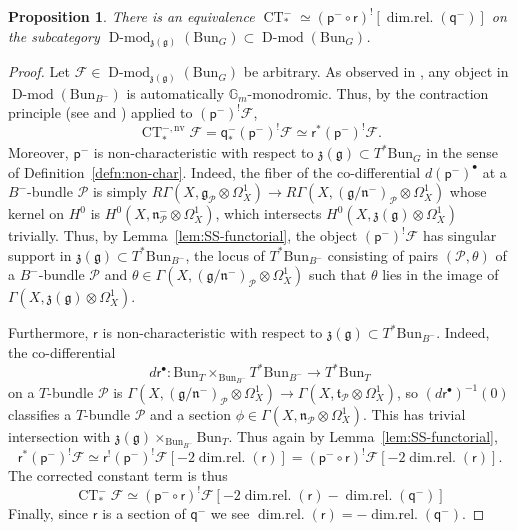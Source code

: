 \documentclass[11pt]{amsart}
\newcommand{\fg}{\mathfrak{g}}
\newcommand{\fn}{\mathfrak{n}}
\newcommand{\fz}{\mathfrak{z}}
\newcommand{\bG}{\mathbb{G}}
\newcommand{\cF}{\mathcal{F}}
\newcommand{\ft}{{\mathfrak{t}}}
\newcommand{\cP}{{\mathcal{P}}}
\newcommand{\Bun}{{\mathrm{Bun}}}
\newcommand{\CT}{\operatorname{CT}}
\newcommand{\pp}{{\mathsf{p}}}
\newcommand{\qq}{{\mathsf{q}}}
\newcommand{\rr}{{\mathsf{r}}}
\DeclareMathOperator{\Dmod}{D-mod}
\newtheorem{prop}[thm]{Proposition}
\theoremstyle{remark}
\theoremstyle{definition}
\begin{document}
\begin{prop}\label{prop:eisenstein-and-delta}
    There is an equivalence $\CT^-_*\simeq(\pp^-\circ\rr)^![\operatorname{dim.rel.}(\qq^-)]$ on the subcategory $\Dmod_{\fz(\fg)}(\Bun_G)\subset\Dmod(\Bun_G)$. 
\end{prop}
\begin{proof}
Let $\cF\in\Dmod_{\fz(\fg)}(\Bun_G)$ be arbitrary. As observed in \cite[\S4.1.6]{constant-term}, any object in $\Dmod(\Bun_{B^-})$ is automatically $\bG_m$-monodromic. Thus, by the contraction principle (see \cite[\S4.1]{constant-term} and \cite[Theorem~C.5.3]{compact-generation}) applied to $(\pp^-)^!\cF$,
\[
\CT^{-,\mathrm{nv}}_*\cF=\qq^-_*(\pp^-)^!\cF\simeq\rr^*(\pp^-)^!\cF.
\]
Moreover, $\pp^-$ is non-characteristic with respect to $\fz(\fg)\subset T^*\Bun_G$ in the sense of Definition~\ref{defn:non-char}. Indeed, the fiber of the co-differential $d(\pp^-)^\bullet$ at a $B^-$-bundle $\cP$ is simply $R\Gamma(X,\fg_\cP\otimes\Omega^1_X)\to R\Gamma(X,(\fg/\fn^-)_\cP\otimes\Omega^1_X)$ whose kernel on $H^0$ is $ H^0(X,\fn^-_\cP\otimes\Omega^1_X)$, which intersects $ H^0(X,\fz(\fg)\otimes\Omega^1_X)$ trivially. Thus, by Lemma~\ref{lem:SS-functorial}, the object $(\pp^-)^!\cF$ has singular support in $\fz(\fg)\subset T^*\Bun_{B^-}$, the locus of $T^*\Bun_{B^-}$ consisting of pairs $(\cP,\theta)$ of a $B^-$-bundle $\cP$ and $\theta\in \Gamma(X,(\fg/\fn^-)_\cP\otimes\Omega^1_X)$ such that $\theta$ lies in the image of $\Gamma(X,\fz(\fg)\otimes\Omega^1_X)$.

Furthermore, $\rr$ is non-characteristic with respect to $\fz(\fg)\subset T^*\Bun_{B^-}$. Indeed, the co-differential
   \[
   d\rr^\bullet\colon\Bun_T\times_{\Bun_{B^-}}T^*\Bun_{B^-}\to T^*\Bun_T
   \]
   on a $T$-bundle $\cP$ is $\Gamma(X,(\fg/\fn^-)_\cP\otimes\Omega^1_X)\to\Gamma(X,\ft_\cP\otimes\Omega^1_X)$, so $(d\rr^\bullet)^{-1}(0)$ classifies a $T$-bundle $\cP$ and a section $\phi\in\Gamma(X,\fn_\cP\otimes\Omega^1_X)$. This has trivial intersection with $\fz(\fg)\times_{\Bun_{B^-}}\Bun_T$. Thus again by Lemma~\ref{lem:SS-functorial},
   \[
   \rr^*(\pp^-)^!\cF\simeq\rr^!(\pp^-)^!\cF[-2\operatorname{dim.rel.}(\rr)]=(\pp^-\circ\rr)^!\cF[-2\operatorname{dim.rel.}(\rr)].
   \]   
   The corrected constant term is thus
   \[
   \CT^-_*\cF\simeq(\pp^-\circ\rr)^!\cF[-2\operatorname{dim.rel.}(\rr)-\operatorname{dim.rel.}(\qq^-)]
   \]
   Finally, since $\rr$ is a section of $\qq^-$ we see $\operatorname{dim.rel.}(\rr)=-\operatorname{dim.rel.}(\qq^-)$.
\end{proof}
\end{document}
